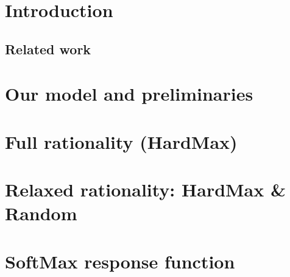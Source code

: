 \documentclass[11pt]{article}
\begin{document}

\newpage
\begin{small}
\tableofcontents
\end{small}
\newpage

%
%
\section{Introduction}
\label{sec:intro}


\subsection{Related work}
\label{sec:related-work}


\section{Our model and preliminaries}
\label{sec:model}


\section{Full rationality (HardMax)}
\label{sec:rational}


\section{Relaxed rationality: HardMax \& Random}
\label{sec:random}


\section{SoftMax response function}
\label{sec:soft}


%

\gaedit{

}


\end{document}
